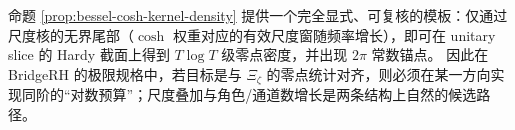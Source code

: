 \begin{remark}\label{rem:bessel-template-bridge}
命题 \ref{prop:bessel-cosh-kernel-density} 提供一个完全显式、可复核的模板：仅通过尺度核的无界尾部（$\cosh$ 权重对应的有效尺度窗随频率增长），即可在 unitary slice 的 Hardy 截面上得到 $T\log T$ 级零点密度，并出现 $2\pi$ 常数锚点。
因此在 BridgeRH 的极限规格中，若目标是与 $\Xi_\zeta$ 的零点统计对齐，则必须在某一方向实现同阶的“对数预算”；尺度叠加与角色/通道数增长是两条结构上自然的候选路径。
\end{remark}

